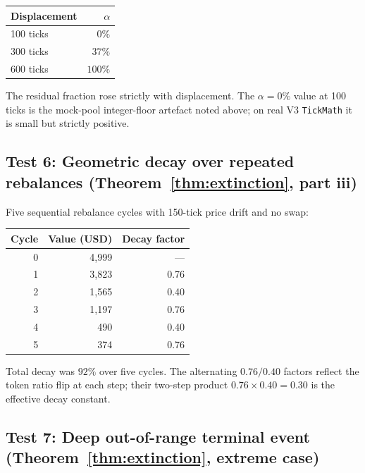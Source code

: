 \documentclass[11pt,a4paper]{article}
\theoremstyle{plain}
\begin{document}
\begin{table}[H]
\centering
\begin{tabular}{@{}lr@{}}
\toprule
Displacement & $\alpha$ \\
\midrule
100 ticks & $0\%$ \\
300 ticks & $37\%$ \\
600 ticks & $100\%$ \\
\bottomrule
\end{tabular}
\end{table}

\noindent The residual fraction rose strictly with displacement. The $\alpha = 0\%$ value at 100 ticks is the mock-pool integer-floor artefact noted above; on real V3 \texttt{TickMath} it is small but strictly positive.

\subsection{Test 6: Geometric decay over repeated rebalances (Theorem~\ref{thm:extinction}, part iii)}\label{sec:foundry-decay}

Five sequential rebalance cycles with 150-tick price drift and no swap:

\begin{table}[H]
\centering
\begin{tabular}{@{}rrr@{}}
\toprule
Cycle & Value (USD) & Decay factor \\
\midrule
0 & 4{,}999 & --- \\
1 & 3{,}823 & 0.76 \\
2 & 1{,}565 & 0.40 \\
3 & 1{,}197 & 0.76 \\
4 & 490     & 0.40 \\
5 & 374     & 0.76 \\
\bottomrule
\end{tabular}
\end{table}

\noindent Total decay was $92\%$ over five cycles. The alternating $0.76 / 0.40$ factors reflect the token ratio flip at each step; their two-step product $0.76 \times 0.40 = 0.30$ is the effective decay constant.

\subsection{Test 7: Deep out-of-range terminal event (Theorem~\ref{thm:extinction}, extreme case)}\label{sec:foundry-terminal}
\end{document}

